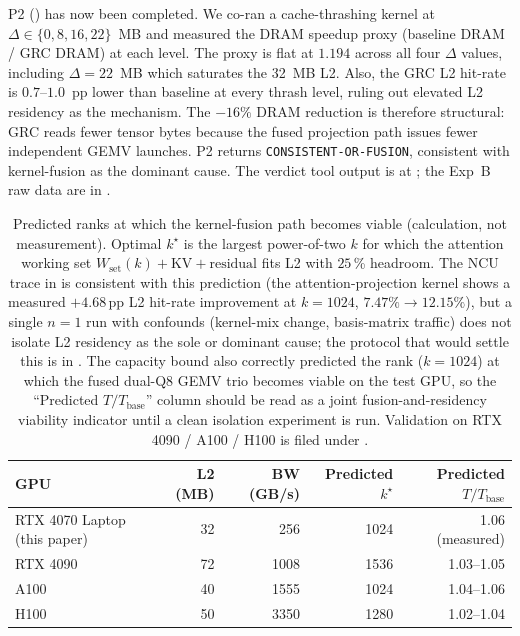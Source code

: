 \documentclass[11pt]{article}
\begin{document}
P2 () has now been completed.
We co-ran a cache-thrashing kernel at $\Delta\in\{0,8,16,22\}$~MB
and measured the DRAM speedup proxy (baseline DRAM / GRC DRAM) at
each level. The proxy is flat at $1.194$ across all four $\Delta$
values, including $\Delta{=}22$~MB which saturates the 32~MB L2.
Also, the GRC L2 hit-rate is $0.7$--$1.0$~pp lower than
baseline at every thrash level, ruling out elevated L2 residency as the
mechanism. The $-16\%$ DRAM reduction is therefore structural: GRC
reads fewer tensor bytes because the fused projection path issues
fewer independent GEMV launches. P2 returns
\texttt{CONSISTENT-OR-FUSION}, consistent with kernel-fusion as the
dominant cause. The verdict tool output is at
; the Exp~B
raw data are in .

\begin{table}[h]\centering\small
\caption{Predicted ranks at which the kernel-fusion path becomes
viable (calculation, not measurement). Optimal $k^\star$ is the
largest power-of-two $k$ for which the attention working set
$W_\text{set}(k)+\text{KV}+\text{residual}$ fits L2 with $25$\,\%
headroom. The NCU trace in  is consistent with
this prediction (the attention-projection kernel shows a measured
$+4.68$\,pp L2 hit-rate improvement at $k{=}1024$, $7.47\%\to12.15\%$),
but a single $n{=}1$ run with confounds (kernel-mix change,
basis-matrix traffic) does not isolate L2 residency as the sole or
dominant cause; the protocol that would settle this is in
. The capacity bound also correctly
predicted the rank ($k{=}1024$) at which the fused dual-Q8
GEMV trio becomes viable on the test GPU, so the
``Predicted $T/T_\text{base}$'' column should be read as a joint
fusion-and-residency viability indicator until a clean isolation
experiment is run. Validation on RTX 4090 / A100 / H100 is filed
under .}
\label{tab:predict}
\begin{tabular}{@{}lrrrr@{}}
\toprule
GPU & L2 (MB) & BW (GB/s) & Predicted $k^\star$ & Predicted $T/T_\text{base}$ \\
\midrule
RTX 4070 Laptop (this paper) & 32 & 256 & 1024 & 1.06 (measured) \\
RTX 4090 & 72 & 1008 & 1536 & 1.03--1.05 \\
A100 & 40 & 1555 & 1024 & 1.04--1.06 \\
H100 & 50 & 3350 & 1280 & 1.02--1.04 \\
\bottomrule
\end{tabular}
\end{table}
\end{document}
